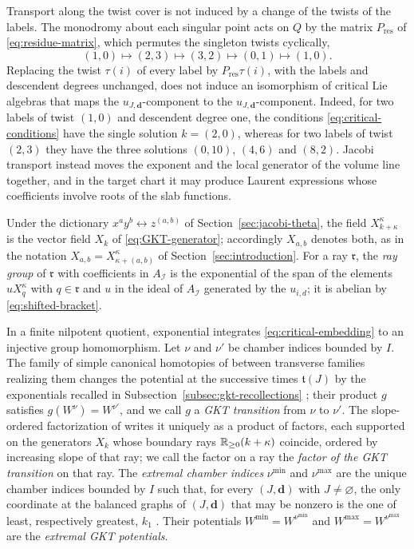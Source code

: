 Transport along the twist cover is not induced by a change of the
twists of the labels.  The monodromy about each singular point acts on $Q$ by
the matrix $P_{\mathrm{res}}$ of \eqref{eq:residue-matrix}, which permutes the
singleton twists cyclically,
\[
 (1,0)\mapsto(2,3)\mapsto(3,2)\mapsto(0,1)\mapsto(1,0).
\]
Replacing the twist $\tau(i)$ of every label by $P_{\mathrm{res}}\tau(i)$,
with the labels and descendent degrees unchanged, does not induce an
isomorphism of critical Lie algebras that maps the $u_{J,\mathbf d}$-component to
the $u_{J,\mathbf d}$-component.  Indeed, for two labels of twist $(1,0)$ and
descendent degree one, the conditions \eqref{eq:critical-conditions} have the
single solution $k=(2,0)$, whereas for two labels of twist $(2,3)$ they have
the three solutions $(0,10)$, $(4,6)$ and $(8,2)$.  Jacobi transport instead
moves the exponent and the local generator of the volume line together, and in the target chart it
may produce Laurent expressions whose coefficients involve roots of the slab
functions.

Under the dictionary $x^ay^b\leftrightarrow z^{(a,b)}$ of
Section~\ref{sec:jacobi-theta}, the field $X^\kappa_{k+\kappa}$ is the vector
field $X_k$ of \eqref{eq:GKT-generator}; accordingly $X_{a,b}$ denotes both,
as in the notation $X_{a,b}=X^\kappa_{\kappa+(a,b)}$ of
Section~\ref{sec:introduction}.  For a ray $\mathfrak r$, the \emph{ray group}
of $\mathfrak r$ with coefficients in $A_{\mathcal I}$ is the exponential of
the span of the elements $uX^\kappa_q$ with $q\in\mathfrak r$ and $u$ in the
ideal of $A_{\mathcal I}$ generated by the $u_{i,d}$; it is abelian by
\eqref{eq:shifted-bracket}.

In a finite nilpotent quotient, exponential integrates
\eqref{eq:critical-embedding} to an injective group homomorphism.  Let $\nu$
and $\nu'$ be chamber indices bounded by $I$.  The family of simple canonical
homotopies of \cite[Lem.~3.40]{grossetal2022open} between transverse
families realizing them changes the potential at the successive times
$\mathfrak t(J)$ by the exponentials recalled in
Subsection~\ref{subsec:gkt-recollections} \cite[Thm.~5.9, with
Lem.~3.40]{grossetal2022open}; their product $g$ satisfies
$g(W^\nu)=W^{\nu'}$, and we call $g$ a \emph{GKT transition} from $\nu$ to
$\nu'$.  The slope-ordered factorization of
\cite[Prop.~3.1]{wuebben2026boundary} writes it uniquely as a product
of factors, each supported on the generators $X_k$ whose boundary rays
$\mathbb R_{\geq0}(k+\kappa)$ coincide, ordered by increasing slope of that ray; we
call the factor on a ray the \emph{factor of the GKT transition} on that
ray.  The \emph{extremal
chamber indices} $\nu^{\min}$ and $\nu^{\max}$ are the unique chamber indices
bounded by $I$ such that, for every $(J,\mathbf d)$ with $J\neq\varnothing$,
the only coordinate at
the balanced graphs of $(J,\mathbf d)$ that may be nonzero is the one of
least, respectively greatest, $k_1$ \cite[Thm.~1.1]{wuebben2026boundary}.
Their potentials $W^{\min}=W^{\nu^{\min}}$ and $W^{\max}=W^{\nu^{\max}}$ are
the \emph{extremal GKT potentials}.

